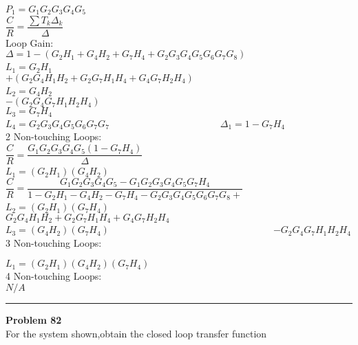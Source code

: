 \documentclass[11pt,letterpaper]{article}
\begin{document}
$P_1=G_1G_2G_3G_4G_5$~~~~~~~~~~~~~~~~~~~~~~~~~~~~~~~~~~~~~~~~~~~~~~~~~$\dfrac{C}{R}=\dfrac{\sum T_k\Delta_k}{\Delta}$ \\    

Loop Gain:~~~~~~~~~~~~~~~~~~~~~~~~~~~~~~~~~~~~~~~~~$\Delta=1-(G_2H_1+G_4H_2+G_7H_4+G_2G_3G_4G_5G_6G_7G_8)$\\
$L_1=G_2H_1$~~~~~~~~~~~~~~~~~~~~~~~~~~~~~~~~~~~~~~~~~~~~~~~$+(G_2G_4H_1H_2+G_2G_7H_1H_4+G_4G_7H_2H_4)$\\
$L_2=G_4H_2$~~~~~~~~~~~~~~~~~~~~~~~~~~~~~~~~~~~~~~~~~~~~~~~$-(G_2G_4G_7H_1H_2H_4)$\\
$L_3=G_7H_4$\\
$L_4=G_2G_3G_4G_5G_6G_7G_7$~~~~~~~~~~~~~~~~~~~~~~~$\Delta_1=1-G_7H_4$\\

2 Non-touching Loops:~~~~~~~~~~~~~~~~~~~~~~~~~~~~~~~~~~~~~~$\dfrac{C}{R}=\dfrac{G_1G_2G_3G_4G_5(1-G_7H_4)}{\Delta}$\\

$L_1=(G_2H_1)(G_4H_2)$~~~~~~~~~~~~~~~~~~~~~~~~~$\dfrac{C}{R}=\dfrac{G_1G_2G_3G_4G_5-G_1G_2G_3G_4G_5G_7H_4}{1-G_2H_1-G_4H_2-G_7H_4-G_2G_3G_4G_5G_6G_7G_8+}$\\
$L_2=(G_2H_1)(G_7H_4)$~~~~~~~~~~~~~~~~~~~~~~~~~~~~~~~~~$G_2G_4H_1H_2+G_2G_7H_1H_4+G_4G_7H_2H_4$\\
$L_3=(G_4H_2)(G_7H_4)$~~~~~~~~~~~~~~~~~~~~~~~~~~~~~~~~~~$-G_2G_4G_7H_1H_2H_4$\\

3 Non-touching Loops:

$L_1=(G_2H_1)(G_4H_2)(G_7H_4)$\\

4 Non-touching Loops:\\

$N/A$

\clearpage
\rule{\textwidth}{1pt}
\textbf{Problem 82}\\
For the system shown,obtain the closed loop transfer function \\
\end{document}
